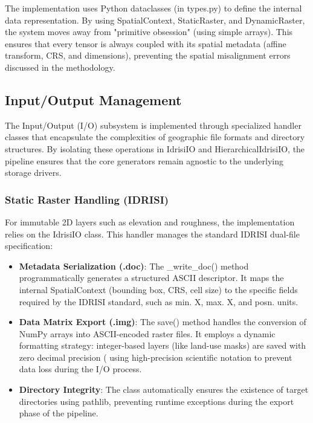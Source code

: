 The implementation uses Python dataclasses (in types.py) to define the internal data representation. By using 
SpatialContext, StaticRaster, and DynamicRaster, the system moves away from "primitive obsession" (using simple 
arrays). This ensures that every tensor is always coupled with its spatial metadata (affine transform, CRS, and 
dimensions), preventing the spatial misalignment errors discussed in the methodology.


\subsection{Input/Output Management}

The Input/Output (I/O) subsystem is implemented through specialized handler classes that encapsulate the 
complexities of geographic file formats and directory structures. By isolating these operations in IdrisiIO and 
HierarchicalIdrisiIO, the pipeline ensures that the core generators remain agnostic to the underlying storage 
drivers.


\subsubsection{Static Raster Handling (IDRISI)}

For immutable 2D layers such as elevation and roughness, the implementation relies on the IdrisiIO class. This 
handler manages the standard IDRISI dual-file specification:

\begin{itemize}
    \item \textbf{Metadata Serialization (.doc)}: The \_write\_doc() method programmatically generates a structured 
    ASCII descriptor. It maps the internal SpatialContext (bounding box, CRS, cell size) to the specific fields 
    required by the IDRISI standard, such as min. X, max. X, and posn. units.
    \item \textbf{Data Matrix Export (.img)}: The save() method handles the conversion of NumPy arrays into 
    ASCII-encoded raster files. It employs a dynamic formatting strategy: integer-based layers (like land-use masks) 
    are saved with zero decimal precision (%
    using high-precision scientific notation to prevent data loss during the I/O process.
    \item \textbf{Directory Integrity}: The class automatically ensures the existence of target directories using 
    pathlib, preventing runtime exceptions during the export phase of the pipeline.
\end{itemize}


